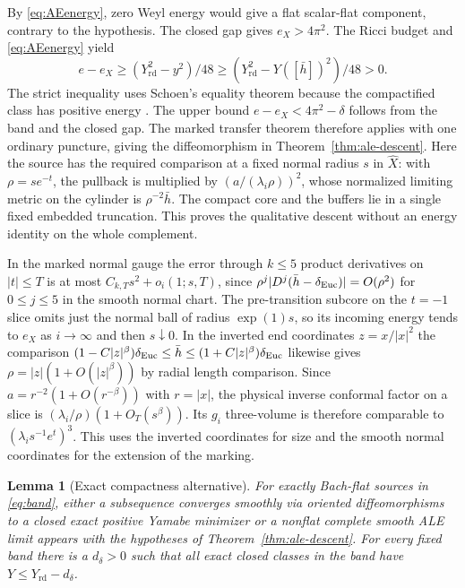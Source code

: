 \documentclass[11pt]{article}
\numberwithin{equation}{section}
\newtheorem{lemma}[theorem]{Lemma}
\theoremstyle{definition}
\theoremstyle{remark}
\newcommand{\Yrd}{Y_{\mathrm{rd}}}
\begin{document}
By \eqref{eq:AEenergy}, zero Weyl energy would give a flat
scalar-flat component, contrary to the hypothesis. The closed
gap gives \(e_X>4\pi^2\). The Ricci budget and
\eqref{eq:AEenergy} yield
\begin{equation}\label{eq:residual}
 e-e_X\ge (\Yrd^2-y^2)/48
         \ge (\Yrd^2-Y([\bar h])^2)/48>0.
\end{equation}
The strict inequality uses Schoen's equality theorem because
the compactified class has positive energy
\cite[Theorem 2]{Schoen1984Yamabe}. The upper bound
\(e-e_X<4\pi^2-\delta\) follows from the band and the closed gap.
The marked transfer theorem therefore applies with one ordinary
puncture, giving the diffeomorphism in Theorem~\ref{thm:ale-descent}.
Here the source has the required comparison at a fixed
normal radius \(s\) in \(\widehat X\): with
\(\rho=s e^{-t}\), the pullback is multiplied by
\((a/(\lambda_i\rho))^2\), whose normalized limiting metric on
the cylinder is \(\rho^{-2}\bar h\). The compact core and the
buffers lie in a single fixed embedded truncation. This proves
the qualitative descent without an energy identity on the
whole complement.

In the marked normal gauge the error through \(k\le5\)
product derivatives on \(|t|\le T\) is at most
\(C_{k,T}s^2+o_i(1;s,T)\), since
\(\rho^j|D^j(\bar h-\delta_{\rm Euc})|=O(\rho^2)\)
for \(0\le j\le5\) in the smooth normal chart. The
pre-transition subcore on the \(t=-1\) slice omits just
the normal ball of radius \(\exp(1)s\), so its incoming energy
tends to \(e_X\) as \(i\to\infty\) and then \(s\downarrow0\).
In the inverted end coordinates \(z=x/|x|^2\) the
comparison \( (1-C|z|^\beta)\delta_{\rm Euc}
\le \bar h\le (1+C|z|^\beta)\delta_{\rm Euc}\) likewise
gives \(\rho=|z|(1+O(|z|^\beta))\) by radial length
comparison. Since \(a=r^{-2}(1+O(r^{-\beta}))\) with
\(r=|x|\), the physical inverse conformal factor on a
slice is \((\lambda_i/\rho)(1+O_T(s^\beta))\).
Its \(g_i\) three-volume is therefore comparable to
\((\lambda_i s^{-1}e^t)^3\). This uses the inverted
coordinates for size and the smooth normal coordinates for
the extension of the marking.

\begin{lemma}[Exact compactness alternative]\label{thm:exact-compactness}
For exactly Bach-flat sources in \eqref{eq:band}, either a
subsequence converges smoothly via oriented diffeomorphisms
to a closed exact positive Yamabe minimizer or a nonflat
complete smooth ALE limit appears with the hypotheses of
Theorem~\ref{thm:ale-descent}. For every fixed band there is a
\(d_\delta>0\) such that all exact closed classes in the band
have \(Y\le\Yrd-d_\delta\).
\end{lemma}
\end{document}
